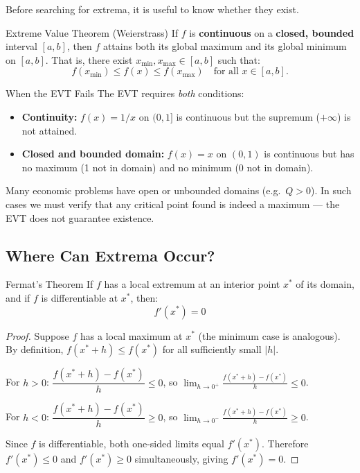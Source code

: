 \documentclass[12pt, a4paper]{article}
\theoremstyle{definition}
\newcommand{\limit}[2]{\lim_{#1 \to #2}}
\begin{document}
Before searching for extrema, it is useful to know whether they exist.

\begin{thmbox}{Extreme Value Theorem (Weierstrass)}
If $f$ is \textbf{continuous} on a \textbf{closed, bounded} interval
$[a, b]$, then $f$ attains both its global maximum and its global minimum
on $[a, b]$.  That is, there exist $x_{\min}, x_{\max} \in [a,b]$ such that:
\[
  f(x_{\min}) \leq f(x) \leq f(x_{\max})
  \quad \text{for all } x \in [a, b].
\]
\end{thmbox}

\begin{notebox}{When the EVT Fails}
The EVT requires \emph{both} conditions:
\begin{itemize}
  \item \textbf{Continuity:} $f(x) = 1/x$ on $(0,1]$ is continuous but the
        supremum ($+\infty$) is not attained.
  \item \textbf{Closed and bounded domain:} $f(x) = x$ on $(0,1)$ is
        continuous but has no maximum (1 not in domain) and no minimum
        (0 not in domain).
\end{itemize}
Many economic problems have open or unbounded domains (e.g.\ $Q > 0$).  In
such cases we must verify that any critical point found is indeed a maximum
--- the EVT does not guarantee existence.
\end{notebox}

\subsection{Where Can Extrema Occur?}

\begin{thmbox}{Fermat's Theorem}
If $f$ has a local extremum at an interior point $x^*$ of its domain, and if
$f$ is differentiable at $x^*$, then:
\[
  f'(x^*) = 0
\]
\end{thmbox}

\begin{proof}
Suppose $f$ has a local maximum at $x^*$ (the minimum case is analogous).
By definition, $f(x^*+h) \leq f(x^*)$ for all sufficiently small $|h|$.

For $h > 0$: $\dfrac{f(x^*+h) - f(x^*)}{h} \leq 0$, so
$\displaystyle\limit{h}{0^+}\frac{f(x^*+h)-f(x^*)}{h} \leq 0$.

For $h < 0$: $\dfrac{f(x^*+h) - f(x^*)}{h} \geq 0$, so
$\displaystyle\limit{h}{0^-}\frac{f(x^*+h)-f(x^*)}{h} \geq 0$.

Since $f$ is differentiable, both one-sided limits equal $f'(x^*)$.
Therefore $f'(x^*) \leq 0$ and $f'(x^*) \geq 0$ simultaneously,
giving $f'(x^*) = 0$.
\end{proof}
\end{document}
